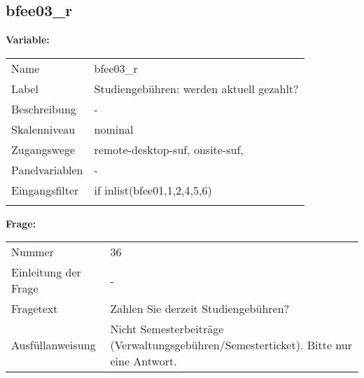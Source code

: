 	
	
	\subsection{bfee03\_r}
	\label{subSection:bfee03_r}

	\noindent\textbf{Variable:}\\
		\begin{tabular}{lL{11.3cm}}
			\label{tableVariable:bfee03_r}
			Name & bfee03\_r \\
			Label & Studiengebühren: werden aktuell gezahlt? \\
			Beschreibung & - \\
			Skalenniveau & nominal \\
			Zugangswege &
				remote-desktop-suf,
				onsite-suf,
 \\
			Panelvariablen & -
			 \\
			Eingangsfilter & if inlist(bfee01,1,2,4,5,6) \\
 \\
		\end{tabular}

		\vspace*{1 cm}
		\noindent\textbf{Frage:}\\
		\begin{tabular}{lL{11.3cm}}
			\label{tableQuestion:bfee03_r}
			Nummer & 36 \\
			Einleitung der Frage & - \\
			Fragetext & Zahlen Sie derzeit Studiengebühren? \\
			Ausfüllanweisung & Nicht Semesterbeiträge (Verwaltungsgebühren/Semesterticket). Bitte nur eine Antwort. \\
		\end{tabular}





